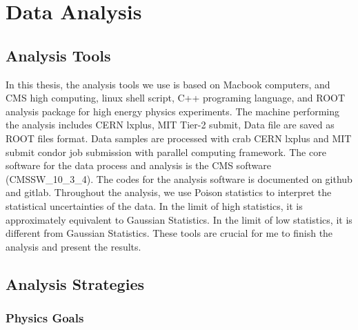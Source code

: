 \chapter{Data Analysis}

\section{Analysis Tools}

In this thesis, the analysis tools we use is based on Macbook computers, and CMS high computing, linux shell script, C++ programing language, and ROOT analysis package for high energy physics experiments. The machine performing the analysis includes CERN lxplus, MIT Tier-2 submit, Data file are saved as ROOT files format. Data samples are processed with crab CERN lxplus and MIT submit condor job submission with parallel computing framework. The core software for the data process and analysis is the CMS software (CMSSW\_10\_3\_4). The codes for the analysis software is documented on github and gitlab. Throughout the analysis, we use Poison statistics to interpret the statistical uncertainties of the data. In the limit of high statistics, it is approximately equivalent to Gaussian Statistics. In the limit of low statistics, it is different from Gaussian Statistics. These tools are crucial for me to finish the analysis and present the results.

\section{Analysis Strategies}

\subsection{Physics Goals}


